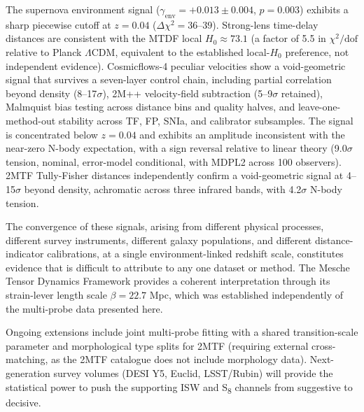 \documentclass[11pt,a4paper]{article}
\begin{document}
The supernova environment signal (\(\gamma_\mathrm{env} = +0.013 \pm 0.004\), \(p = 0.003\)) exhibits a sharp piecewise cutoff at \(z = 0.04\) (\(\Delta\chi^2 = 36\text{--}39\)). Strong-lens time-delay distances are consistent with the MTDF local \(H_0 \approx 73.1\) (a factor of 5.5 in \(\chi^2/\mathrm{dof}\) relative to Planck \(\Lambda\)CDM, equivalent to the established local-\(H_0\) preference, not independent evidence). Cosmicflows-4 peculiar velocities show a void-geometric signal that survives a seven-layer control chain, including partial correlation beyond density (8--17\(\sigma\)), 2M++ velocity-field subtraction (5--9\(\sigma\) retained), Malmquist bias testing across distance bins and quality halves, and leave-one-method-out stability across TF, FP, SNIa, and calibrator subsamples. The signal is concentrated below \(z = 0.04\) and exhibits an amplitude inconsistent with the near-zero N-body expectation, with a sign reversal relative to linear theory (9.0\(\sigma\) tension, nominal, error-model conditional, with MDPL2 across 100 observers). 2MTF Tully-Fisher distances independently confirm a void-geometric signal at 4--15\(\sigma\) beyond density, achromatic across three infrared bands, with 4.2\(\sigma\) N-body tension.

The convergence of these signals, arising from different physical processes, different survey instruments, different galaxy populations, and different distance-indicator calibrations, at a single environment-linked redshift scale, constitutes evidence that is difficult to attribute to any one dataset or method. The Mesche Tensor Dynamics Framework provides a coherent interpretation through its strain-lever length scale \(\beta = 22.7\) Mpc, which was established independently of the multi-probe data presented here.

Ongoing extensions include joint multi-probe fitting with a shared transition-scale parameter and morphological type splits for 2MTF (requiring external cross-matching, as the 2MTF catalogue does not include morphology data). Next-generation survey volumes (DESI Y5, Euclid, LSST/\allowbreak{}Rubin) will provide the statistical power to push the supporting ISW and S\textsubscript{8} channels from suggestive to decisive.
\end{document}
